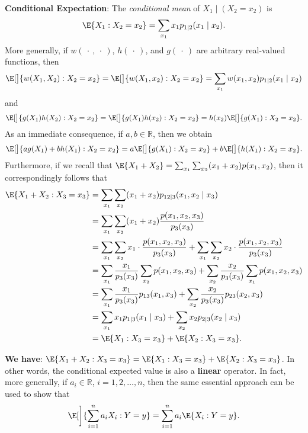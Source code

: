 \begin{Regular}
    \textbf{Conditional Expectation}: The \emph{conditional mean} of $ X_1\mid(X_2=x_2) $ is
    \[ \E{X_1\given X_2=x_2}=\sum_{x_1}x_1 p_{1\mid 2}(x_1\mid x_2).  \]
    More generally, if $ w(\:\cdot\:,\:\cdot\:) $, $ h(\:\cdot\:) $, and $ g(\:\cdot\:) $ are arbitrary real-valued functions, then
    \[ \E[\big]{w(X_1,X_2)\given X_2=x_2}=\E[\big]{w(X_1,x_2)\given X_2=x_2}=\sum_{x_1}w(x_1,x_2)p_{1\mid 2}(x_1\mid x_2) \]
    and
    \[ \E[\big]{g(X_1)h(X_2)\given X_2=x_2}=\E[\big]{g(X_1)h(x_2)\given X_2=x_2}=h(x_2)\E[\big]{g(X_1)\given X_2=x_2}. \]
    As an immediate consequence, if $ a,b\in\mathbb{R} $, then we obtain
    \[ \E[\big]{ag(X_1)+bh(X_1)\given X_2=x_2}=a\E[\big]{g(X_1)\given X_2=x_2}+b\E[\big]{h(X_1)\given X_2=x_2}. \]
    Furthermore, if we recall that $ \E{X_1+X_2}=\sum_{x_1}\sum_{x_2}(x_1+x_2)p(x_1,x_2) $, then it correspondingly follows that
    \begin{align*}
        \E{X_{1}+X_{2} \given X_{3}=x_{3}}
         & =\sum_{x_{1}} \sum_{x_{2}}(x_{1}+x_{2}) p_{12 \mid 3}(x_{1}, x_{2} \mid x_{3})                                                                                       \\
         & =\sum_{x_{1}} \sum_{x_{2}}(x_{1}+x_{2}) \frac{p(x_{1}, x_{2}, x_{3})}{p_{3}(x_{3})}                                                                                  \\
         & =\sum_{x_{1}} \sum_{x_{2}} x_{1} \cdot \frac{p(x_{1}, x_{2}, x_{3})}{p_{3}(x_{3})}+\sum_{x_{1}} \sum_{x_{2}} x_{2} \cdot \frac{p(x_{1}, x_{2}, x_{3})}{p_{3}(x_{3})} \\
         & =\sum_{x_{1}} \frac{x_{1}}{p_{3}(x_{3})} \sum_{x_{2}} p(x_{1}, x_{2}, x_{3})+\sum_{x_{2}} \frac{x_{2}}{p_{3}(x_{3})} \sum_{x_{1}} p(x_{1}, x_{2}, x_{3})             \\
         & =\sum_{x_{1}} \frac{x_{1}}{p_{3}(x_{3})} p_{13}(x_{1}, x_{3})+\sum_{x_{2}} \frac{x_{2}}{p_{3}(x_{3})} p_{23}(x_{2}, x_{3})                                           \\
         & =\sum_{x_{1}} x_{1} p_{1 \mid 3}(x_{1} \mid x_{3})+\sum_{x_{2}} x_{2} p_{2 \mid 3}(x_{2} \mid x_{3})                                                                 \\
         & =\E{X_1\given X_3=x_3}+\E{X_2\given X_3=x_3}.
    \end{align*}
\end{Regular}
\begin{Regular}
    \textbf{We have}: $ \E{X_1+X_2\given X_3=x_3}=\E{X_1\given X_3=x_3}+\E{X_2\given X_3=x_3} $. In other words, the conditional expected
    value is also a \textbf{linear} operator. In fact, more generally, if $ a_i\in\mathbb{R} $, $ i=1,2,\ldots,n $, then the same essential approach can be used to show that
    \[ \E[\bigg]{\sum_{i=1}^{n} a_i X_i\given Y=y}=\sum_{i=1}^{n} a_i\E{X_i\given Y=y}. \]
\end{Regular}

